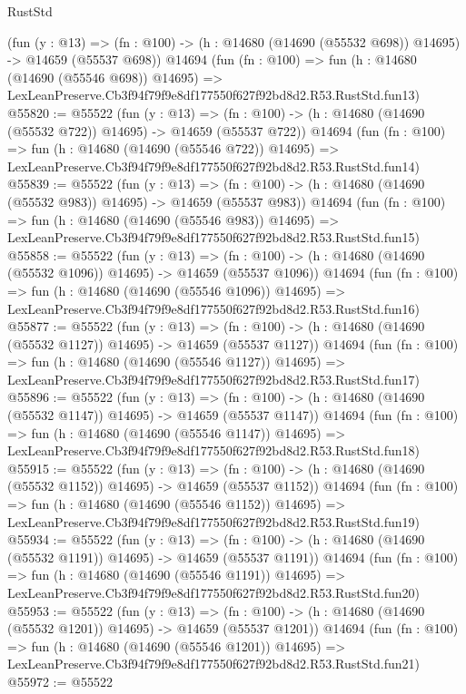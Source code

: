 \begin{lexlean}{RustStd}
\begin{coremodule}
    (fun (y : @13) =>
    (fn : @100) -> (h : @14680 (@14690 (@55532 @698)) @14695) -> @14659 (@55537 @698))
    @14694
    (fun (fn : @100) =>
    fun (h : @14680 (@14690 (@55546 @698)) @14695) =>
    LexLeanPreserve.Cb3f94f79f9e8df177550f627f92bd8d2.R53.RustStd.fun13)
@55820 := @55522
    (fun (y : @13) =>
    (fn : @100) -> (h : @14680 (@14690 (@55532 @722)) @14695) -> @14659 (@55537 @722))
    @14694
    (fun (fn : @100) =>
    fun (h : @14680 (@14690 (@55546 @722)) @14695) =>
    LexLeanPreserve.Cb3f94f79f9e8df177550f627f92bd8d2.R53.RustStd.fun14)
@55839 := @55522
    (fun (y : @13) =>
    (fn : @100) -> (h : @14680 (@14690 (@55532 @983)) @14695) -> @14659 (@55537 @983))
    @14694
    (fun (fn : @100) =>
    fun (h : @14680 (@14690 (@55546 @983)) @14695) =>
    LexLeanPreserve.Cb3f94f79f9e8df177550f627f92bd8d2.R53.RustStd.fun15)
@55858 := @55522
    (fun (y : @13) =>
    (fn : @100) -> (h : @14680 (@14690 (@55532 @1096)) @14695) -> @14659 (@55537 @1096))
    @14694
    (fun (fn : @100) =>
    fun (h : @14680 (@14690 (@55546 @1096)) @14695) =>
    LexLeanPreserve.Cb3f94f79f9e8df177550f627f92bd8d2.R53.RustStd.fun16)
@55877 := @55522
    (fun (y : @13) =>
    (fn : @100) -> (h : @14680 (@14690 (@55532 @1127)) @14695) -> @14659 (@55537 @1127))
    @14694
    (fun (fn : @100) =>
    fun (h : @14680 (@14690 (@55546 @1127)) @14695) =>
    LexLeanPreserve.Cb3f94f79f9e8df177550f627f92bd8d2.R53.RustStd.fun17)
@55896 := @55522
    (fun (y : @13) =>
    (fn : @100) -> (h : @14680 (@14690 (@55532 @1147)) @14695) -> @14659 (@55537 @1147))
    @14694
    (fun (fn : @100) =>
    fun (h : @14680 (@14690 (@55546 @1147)) @14695) =>
    LexLeanPreserve.Cb3f94f79f9e8df177550f627f92bd8d2.R53.RustStd.fun18)
@55915 := @55522
    (fun (y : @13) =>
    (fn : @100) -> (h : @14680 (@14690 (@55532 @1152)) @14695) -> @14659 (@55537 @1152))
    @14694
    (fun (fn : @100) =>
    fun (h : @14680 (@14690 (@55546 @1152)) @14695) =>
    LexLeanPreserve.Cb3f94f79f9e8df177550f627f92bd8d2.R53.RustStd.fun19)
@55934 := @55522
    (fun (y : @13) =>
    (fn : @100) -> (h : @14680 (@14690 (@55532 @1191)) @14695) -> @14659 (@55537 @1191))
    @14694
    (fun (fn : @100) =>
    fun (h : @14680 (@14690 (@55546 @1191)) @14695) =>
    LexLeanPreserve.Cb3f94f79f9e8df177550f627f92bd8d2.R53.RustStd.fun20)
@55953 := @55522
    (fun (y : @13) =>
    (fn : @100) -> (h : @14680 (@14690 (@55532 @1201)) @14695) -> @14659 (@55537 @1201))
    @14694
    (fun (fn : @100) =>
    fun (h : @14680 (@14690 (@55546 @1201)) @14695) =>
    LexLeanPreserve.Cb3f94f79f9e8df177550f627f92bd8d2.R53.RustStd.fun21)
@55972 := @55522

\end{coremodule}
\end{lexlean}
